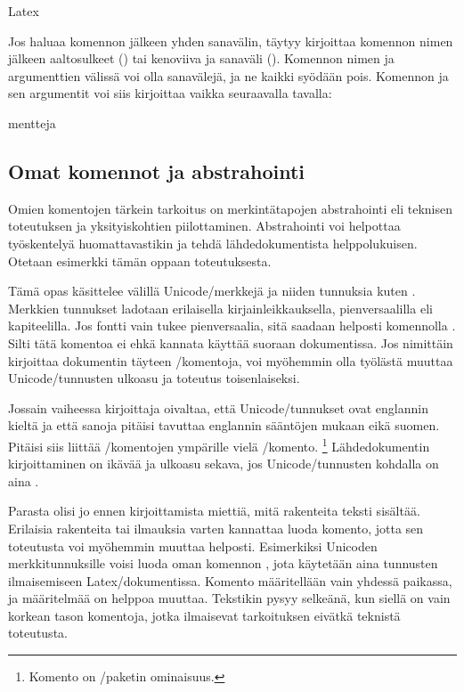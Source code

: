 \begin{tulossis}
  Latex
\end{tulossis}

Jos haluaa komennon jälkeen yhden sanavälin, täytyy kirjoittaa komennon
nimen jälkeen aaltosulkeet () tai kenoviiva ja
sanaväli (). Komennon nimen ja argumenttien
välissä voi olla sanavälejä, ja ne kaikki syödään pois. Komennon ja sen
argumentit voi siis kirjoittaa vaikka seuraavalla tavalla:

\begin{koodilohkosis}
     {mentteja}
\end{koodilohkosis}

\subsection{Omat komennot ja abstrahointi}

Omien komentojen tärkein tarkoitus on merkintätapojen abstrahointi eli
teknisen toteutuksen ja yksityiskohtien piilottaminen. Abstrahointi voi
helpottaa työskentelyä huomattavastikin ja tehdä lähdedokumentista
helppolukuisen. Otetaan esimerkki tämän oppaan toteutuksesta.

Tämä opas käsittelee välillä Unicode\-/merkkejä ja niiden tunnuksia
kuten . Merkkien tunnukset
ladotaan erilaisella kirjainleikkauksella, pienversaalilla eli
kapiteelilla. Jos fontti vain tukee pienversaalia, sitä saadaan helposti
komennolla . Silti tätä komentoa ei ehkä kannata
käyttää suoraan dokumentissa. Jos nimittäin kirjoittaa dokumentin
täyteen \-/komentoja, voi myöhemmin olla työlästä
muuttaa Unicode\-/tunnusten ulko\-asu ja toteutus toisenlaiseksi.

Jossain vaiheessa kirjoittaja oivaltaa, että Unicode\-/tunnukset ovat
englannin kieltä ja että sanoja pitäisi tavuttaa englannin sääntöjen
mukaan eikä suomen. Pitäisi siis liittää \-/komentojen ympärille vielä \-/komento.%
\footnote{Komento  on
  \-/paketin ominaisuus.} Lähdedokumentin
kirjoittaminen on ikävää ja ulko\-asu sekava, jos Unicode\-/tunnusten
kohdalla on aina .

Parasta olisi jo ennen kirjoittamista miettiä, mitä rakenteita teksti
sisältää. Erilaisia rakenteita tai ilmauksia varten kannattaa luoda
komento, jotta sen toteutusta voi myöhemmin muuttaa helposti.
Esimerkiksi Unicoden merkkitunnuksille voisi luoda oman komennon
, jota käytetään aina tunnusten ilmaisemiseen
Latex\-/dokumentissa. Komento määritellään vain yhdessä paikassa, ja
määritelmää on helppoa muuttaa. Tekstikin pysyy selkeänä, kun siellä on
vain korkean tason komentoja, jotka ilmaisevat tarkoituksen eivätkä
teknistä toteutusta.

